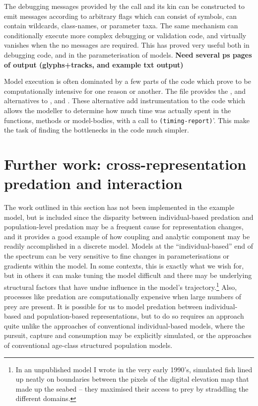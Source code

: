 The debugging messages provided by the  call and its
kin can be constructed to emit messages according to arbitrary flags
which can consist of symbols, can contain wildcards, class-names, or
parameter taxa.  The same mechanism can conditionally execute more
complex debugging or validation code, and virtually vanishes when the
no messages are required.  This has proved very useful both in
debugging code, and in the parameterisation of models.
{\textbf{Need several ps pages of output (glyphs+tracks, and example txt output)}}

\vspace{3mm}
Model execution is often dominated by a few parts of the code which
prove to be computationally intensive for one reason or another.  The
 file provides the ,
 and 
alternatives to ,  and
. These alternative add instrumentation to the code
which allows the modeller to determine how much time was actually
spent in the functions, methods or model-bodies, with a call
to \texttt{(timing-report)}'.  This make the task of finding the
bottlenecks in the code much simpler.



\section{Further work: cross-representation predation and interaction\label{predation5}}

The work outlined in this section has not been implemented in the
example model, but is included since the disparity between
individual-based predation and population-level predation may be a
frequent cause for representation changes, and it provides a good
example of how coupling and analytic component may be readily
accomplished in a discrete model. Models at the ``individual-based''
end of the spectrum can be very sensitive to fine changes in
parameterisations or gradients within the model.  In some contexts,
this is exactly what we wish for, but in others it can make tuning
the model difficult and there may be underlying structural factors
that have undue influence in the model's trajectory.\footnote{In an
  unpublished model I wrote in the very early 1990's, simulated
  fish lined up neatly on boundaries between the pixels of the digital
  elevation map that made up the seabed -- they maximised their
  access to prey by straddling the different domains.}
Also, processes like predation are computationally expensive when
large numbers of prey are present.  It is possible for us to
model predation between individual-based and population-based
representations, but to do so requires an approach quite unlike the
approaches of conventional individual-based models, where the pursuit,
capture and consumption may be explicitly simulated, or the approaches
of conventional age-class structured population models.

